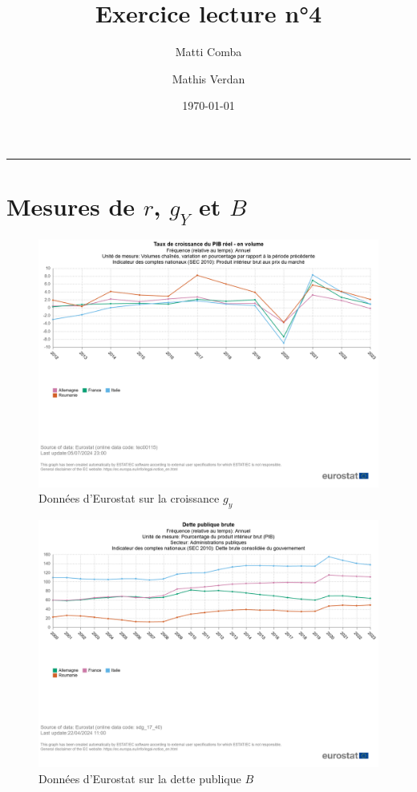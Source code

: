 \documentclass{article}
\title{\Huge \textbf{Exercice lecture n°4}}
\author{Matti Comba \and Mathis Verdan}
\date{\today}
\begin{document}
\maketitle
\begin{center}
  \rule{\linewidth}{0.5mm}
\end{center}


\section{Mesures de $r$, $g_Y$ et $B$}


\begin{figure}[h!]
  \centering
  \begin{minipage}{0.8\textwidth}
      \centering
      \includegraphics[width=\textwidth]{"croissance.png"}
      \caption{Données d'Eurostat sur la croissance $g_y$}
  \end{minipage}
\end{figure}

\begin{figure}[h!]
  \centering
  \begin{minipage}{0.8\textwidth}
      \centering
      \includegraphics[width=\textwidth]{"dette_publique.png"}
      \caption{Données d'Eurostat sur la dette publique $B$}
  \end{minipage}
\end{figure}
\end{document}
